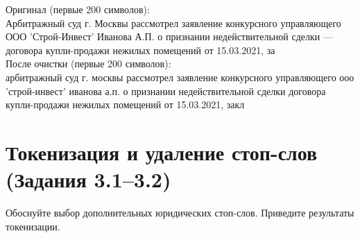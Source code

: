 \documentclass[12pt, a4paper]{report}
\newcommand{\placeholder}[2][Вставьте результат]{%
  \begin{tcolorbox}[placeholderbox, title={#2}]
    #1
  \end{tcolorbox}%
  \vspace{4pt}%
}
\begin{document}
\placeholder[Оригинал (первые 200 символов):\\
Арбитражный суд г. Москвы рассмотрел заявление конкурсного управляющего ООО 'Строй-Инвест' Иванова А.П. о признании недействительной сделки — договора купли-продажи нежилых помещений от 15.03.2021, за\\

После очистки (первые 200 символов):\\
арбитражный суд г. москвы рассмотрел заявление конкурсного управляющего ооо 'строй-инвест' иванова а.п. о признании недействительной сделки договора купли-продажи нежилых помещений от 15.03.2021, закл]{Пример результата очистки}

\section{Токенизация и удаление стоп-слов (Задания 3.1–3.2)}

Обоснуйте выбор дополнительных юридических стоп-слов. Приведите результаты токенизации.
\end{document}
